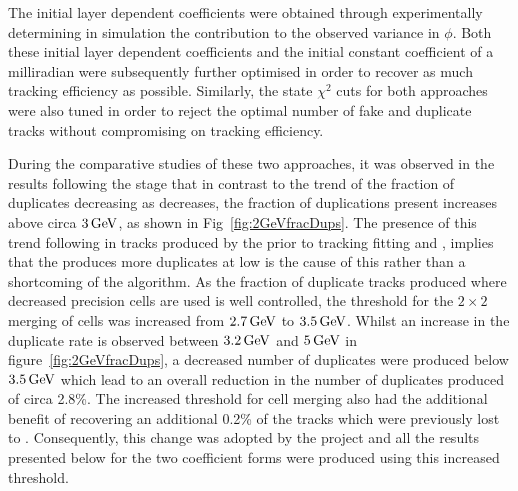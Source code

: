 The initial layer dependent coefficients were obtained through experimentally determining in simulation the \MS contribution to the observed variance in $\phi$.
Both these initial layer dependent coefficients and the initial constant coefficient of a milliradian were subsequently further optimised in order to recover as much tracking efficiency as  possible.
Similarly, the \KF state $\chi^{2}$ cuts for both approaches were also tuned in order to reject the optimal number of fake and duplicate tracks without compromising on tracking efficiency.

During the comparative studies of these two approaches, it was observed in the results following the \DR stage that in contrast to the trend of the fraction of duplicates decreasing as \pT decreases, the fraction of duplications present increases above circa $3\,\text{Ge\hspace{-.08em}V}$, as shown in Fig~\ref{fig:2GeVfracDups}.
The presence of this trend following in tracks produced by the \HT prior to tracking fitting and \DR, implies that the \HT produces more duplicates at low \pT is the cause of this rather than a shortcoming of the \DR algorithm.
As the fraction of duplicate tracks produced where decreased precision \HT cells are used is well controlled, the \pT threshold for the $2 \times 2$ merging of \HT cells was increased from $2.7\,\text{Ge\hspace{-.08em}V}$ to $3.5\,\text{Ge\hspace{-.08em}V}$.
Whilst an increase in the duplicate rate is observed between $3.2\,\text{Ge\hspace{-.08em}V}$ and $5\,\text{Ge\hspace{-.08em}V}$ in figure~\ref{fig:2GeVfracDups}, a decreased number of duplicates were produced below $3.5\,\text{Ge\hspace{-.08em}V}$ which lead to an overall reduction in the number of duplicates produced of circa 2.8\%.
The increased \pT threshold for \HT cell merging also had the additional benefit of recovering an additional 0.2\% of the tracks which were previously lost to \MS.
Consequently, this change was adopted by the project and all the results presented below for the two \MS coefficient forms were produced using this increased threshold. 

